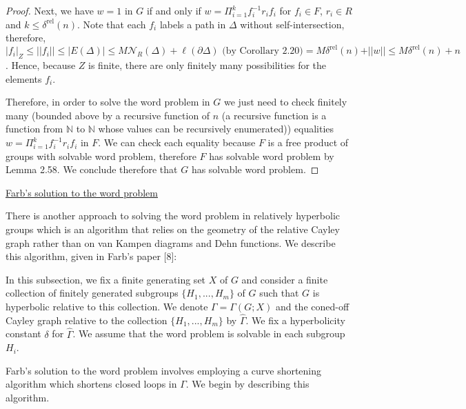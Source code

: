 \documentclass[12pt]{article}
\newcommand{\vs}{\vskip10pt}
\begin{document}
\begin{proof}
		\vs
		
		Next, we have $w = 1$ in $G$ if and only if $w = \Pi_{i=1}^k f_i^{-1} r_i f_i$ for $f_i \in F$, $r_i \in R$ and $k \leq \delta^{\text{rel}}(n)$. Note that each $f_i$ labels a path in $\Delta$ without self-intersection, therefore, $ \vert f_i \vert_Z \leq \vert \vert f_i \vert \vert \leq \vert E(\Delta) \vert \leq M \mathcal{N}_R(\Delta) + \ell(\partial \Delta) \text{ (by Corollary 2.20)} = M \delta^{\text{rel}}(n) + \vert \vert w \vert \vert \leq M \delta^{\text{rel}}(n) + n$. Hence, because $Z$ is finite, there are only finitely many possibilities for the elements $f_i$. 
		
		\vs 
		
		Therefore, in order to solve the word problem in $G$ we just need to check finitely many (bounded above by a recursive function of $n$ (a recursive function is a function from $\mathbb{N}$ to $\mathbb{N}$ whose values can be recursively enumerated)) equalities $w = \Pi_{i=1}^k f_i^{-1} r_i f_i$ in $F$. We can check each equality because $F$ is a free product of groups with solvable word problem, therefore $F$ has solvable word problem by Lemma 2.58. We conclude therefore that $G$ has solvable word problem. 
		
	\end{proof}

	\underline{Farb's solution to the word problem}
	
	\vs

	There is another approach to solving the word problem in relatively hyperbolic groups which is an algorithm that relies on the geometry of the relative Cayley graph rather than on van Kampen diagrams and Dehn functions. We describe this algorithm, given in Farb's paper [8]: 
	
	\vs
	
	In this subsection, we fix a finite generating set $X$ of $G$ and consider a finite collection of finitely generated subgroups $\{H_1,...,H_m\}$ of $G$ such that $G$ is hyperbolic relative to this collection. We denote $\Gamma =  \Gamma(G;X)$ and the coned-off Cayley graph relative to the collection $\{H_1,...,H_m\}$ by $\hat{\Gamma}$. We fix a hyperbolicity constant $\delta$ for $\hat{\Gamma}$. We assume that the word problem is solvable in each subgroup $H_i$. 
	
	\vs
	
	Farb's solution to the word problem involves employing a curve shortening algorithm which shortens closed loops in $\Gamma$. We begin by describing this algorithm. 
	
\end{document}
